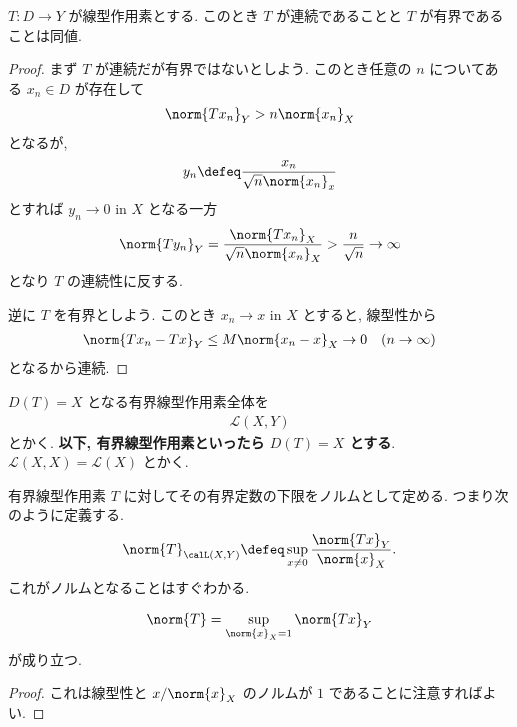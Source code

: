 \documentclass[openany, a4paper, oneside]{jsbook}
\begin{document}
\begin{prop}
$T \colon D \to Y$ が線型作用素とする.
このとき $T$ が連続であることと $T$ が有界であることは同値.
\end{prop}
\begin{proof}
まず $T$ が連続だが有界ではないとしよう.
このとき任意の $n$ についてある $x_n \in D$ が存在して
\begin{align}
 \norm{Tx_n}_Y
 >
 n \norm{x_n}_X
\end{align}
となるが,
\begin{align}
 y_n
 \defeq
 \frac{x_n}{\sqrt{n} \norm{x_n}_x}
\end{align}
とすれば
$y_n \to 0$ in $X$ となる一方
\begin{align}
 \norm{T y_n}_Y
 =
 \frac{\norm{T x_n}_X}{\sqrt{n} \norm{x_n}_X}
 >
 \frac{n}{\sqrt{n}} \to \infty
\end{align}
となり $T$ の連続性に反する.

逆に $T$ を有界としよう.
このとき $x_n \to x$ in $X$ とすると, 線型性から
\begin{align}
 \norm{Tx_n - Tx}_Y
 \le
 M \norm{x_n - x}_X \to 0 \quad (n \to \infty)
\end{align}
となるから連続.
\end{proof}

\begin{defn}
$D(T) = X$ となる有界線型作用素全体を
\begin{align}
 \mathcal{L}(X, Y)
\end{align}
とかく.
\textbf{以下, 有界線型作用素といったら $D(T)=X$ とする}.
$\mathcal{L}(X, X) = \mathcal{L}(X)$ とかく.
\end{defn}
\begin{defn}
有界線型作用素 $T$ に対してその有界定数の下限をノルムとして定める.
つまり次のように定義する.
\begin{align}
 \norm{T}_{\calL (X, Y)}
 \defeq
 \sup_{x \neq 0} \frac{\norm{Tx}_Y}{\norm{x}_X}.
\end{align}
これがノルムとなることはすぐわかる.
\end{defn}

\begin{prop}
\begin{align}
 \norm{T}
 =
 \sup_{\norm{x}_X = 1} \norm{Tx}_Y
\end{align}
が成り立つ.
\end{prop}
\begin{proof}
これは線型性と $x / {\norm{x}_X}$ のノルムが $1$ であることに注意すればよい.
\end{proof}
\end{document}
